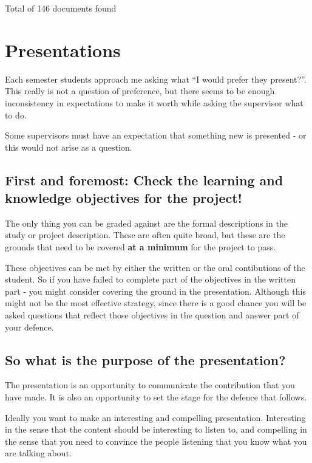 \documentclass[
]{book}
\begin{document}
Total of 146 documents found

\hypertarget{presentations}{%
\chapter{Presentations}\label{presentations}}

Each semester students approach me asking what ``I would prefer they present?''. This really is not a question of preference, but there seems to be enough inconsistency in expectations to make it worth while asking the supervisor what to do.

Some supervisors must have an expectation that something new is presented - or this would not arise as a question.

\hypertarget{first-and-foremost-check-the-learning-and-knowledge-objectives-for-the-project}{%
\section{First and foremost: Check the learning and knowledge objectives for the project!}\label{first-and-foremost-check-the-learning-and-knowledge-objectives-for-the-project}}

The only thing you can be graded against are the formal descriptions in the study or project description. These are often quite broad, but these are the grounds that need to be covered \textbf{at a minimum} for the project to pass.

These objectives can be met by either the written or the oral contibutions of the student. So if you have failed to complete part of the objectives in the written part - you might consider covering the ground in the presentation. Although this might not be the most effective strategy, since there is a good chance you will be asked questions that reflect those objectives in the question and answer part of your defence.

\hypertarget{so-what-is-the-purpose-of-the-presentation}{%
\section{So what is the purpose of the presentation?}\label{so-what-is-the-purpose-of-the-presentation}}

The presentation is an opportunity to communicate the contribution that you have made. It is also an opportunity to set the stage for the defence that follows.

Ideally you want to make an interesting and compelling presentation. Interesting in the sense that the content should be interesting to listen to, and compelling in the sense that you need to convince the people listening that you know what you are talking about.
\end{document}

